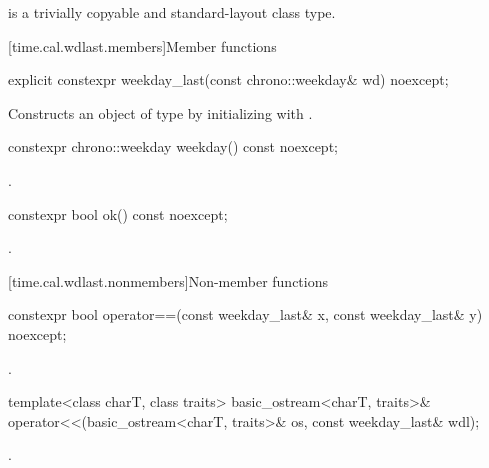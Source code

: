 \pnum
{} is a trivially copyable and standard-layout class type.

[time.cal.wdlast.members]{Member functions}

%
\begin{itemdecl}
explicit constexpr weekday_last(const chrono::weekday& wd) noexcept;
\end{itemdecl}

\begin{itemdescr}
\pnum
\effects
Constructs an object of type  by
initializing  with .
\end{itemdescr}

%
\begin{itemdecl}
constexpr chrono::weekday weekday() const noexcept;
\end{itemdecl}

\begin{itemdescr}
\pnum
\returns {}.
\end{itemdescr}

%
\begin{itemdecl}
constexpr bool ok() const noexcept;
\end{itemdecl}

\begin{itemdescr}
\pnum
\returns {}.
\end{itemdescr}

[time.cal.wdlast.nonmembers]{Non-member functions}

%
\begin{itemdecl}
constexpr bool operator==(const weekday_last& x, const weekday_last& y) noexcept;
\end{itemdecl}

\begin{itemdescr}
\pnum
\returns {}.
\end{itemdescr}

%
\begin{itemdecl}
template<class charT, class traits>
  basic_ostream<charT, traits>&
    operator<<(basic_ostream<charT, traits>& os, const weekday_last& wdl);
\end{itemdecl}

\begin{itemdescr}
\pnum
\returns {}.
\end{itemdescr}


